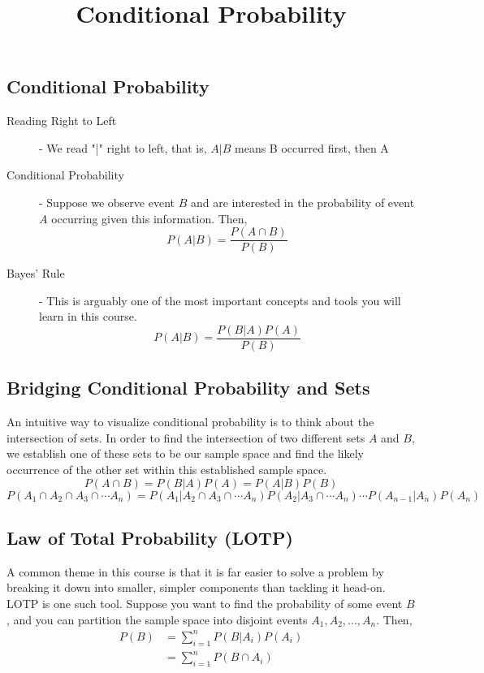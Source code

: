\documentclass[11pt]{article}
\title{Conditional Probability}
\author{\justin}
\begin{document}
\maketitle

\begin{notes}

\section*{Conditional Probability}
\begin{description}
      \item[Reading Right to Left] - We read "|" right to left, that is, $A|B$ means B occurred first, then A
    \item[Conditional Probability] - Suppose we observe event $B$ and are interested in the probability of event $A$ occurring given this information. Then,
        \[P(A|B) = \frac{P(A \cap B)}{P(B)}\]
    \item[Bayes' Rule] - This is arguably one of the most important concepts and tools you will
    learn in this course. 
        \[P(A|B) = \frac{P(B|A)P(A)}{P(B)}\]
\end{description}

\subsection*{Bridging Conditional Probability and Sets}

An intuitive way to visualize conditional probability is to think about the intersection of sets.  In order to find the intersection of two different sets ${A}$ and ${B}$, we establish one of these sets to be our sample space and find the likely occurrence of the other set within this established sample space.
       $$P(A\cap B) = P(B|A)P(A) = P(A|B)P(B)$$
$$P(A_1\cap A_2\cap A_3\cap\cdots A_n) = P(A_1|A_2\cap A_3\cap\cdots A_n)P(A_2| A_3\cap\cdots A_n)\cdots P(A_{n-1}|A_n)P(A_n)$$

\subsection*{Law of Total Probability (LOTP)}
A common theme in this course is that it is far easier to solve a problem by breaking it down into smaller, simpler components than tackling it head-on. LOTP is one such tool. Suppose you want to find the probability of some event $B$, and you can partition the sample space into disjoint events $A_1, A_2, \dots, A_n$. Then, 
\begin{align}
    P(B) &= \sum_{i=1}^n P(B | A_i) P(A_i)\\
    &= \sum_{i=1}^n P(B \cap A_i)
\end{align}


\end{notes}
\end{document}
